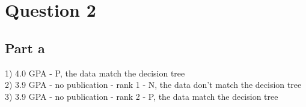 \documentclass[12pt]{article}
\begin{document}
\section*{Question 2}

\subsection*{Part a}

1) 4.0 GPA - P, the data match the decision tree\\
2) 3.9 GPA - no publication - rank 1 - N, the data don't match the decision tree\\
3) 3.9 GPA - no publication - rank 2 - P, the data match the decision tree\\
\end{document}
